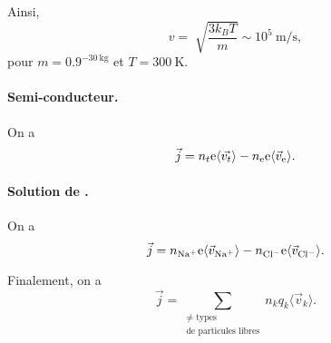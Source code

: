                 Ainsi,
                \begin{equation*}
                    v=\sqrt[]{\frac{3k_B T}{m}}\sim 10^{5}~\si{\metre\per\second},
                \end{equation*}
                pour $m=0.9^{-30~\si{\kilo\gram}}$ et $T=300~\si{\kelvin}$.

            \paragraph{Semi-conducteur.} 

                On a 
                \begin{equation*}
                    \vec{j}=n_t\mathrm{e}\langle \vec{v_t}\rangle-n_{\mathrm{e}}\mathrm{e}\langle\vec{v}_{\mathrm{e}}\rangle.
                \end{equation*}

            \paragraph{Solution de .}

                On a 
                \begin{equation*}
                    \vec{j}=n_{\ce{Na+}}\e\langle\vec{v}_{\ce{Na+}}\rangle-n_{\ce{Cl-}}\e\langle\vec{v}_{\ce{Cl-}}\rangle.
                \end{equation*}

            Finalement, on a 
            \begin{equation*}
                \boxed{
                    \vec{j}=\sum_{\substack{\neq\text{ types}\\\text{de particules libres}}}n_k q_k\langle \vec{v}_k\rangle.
                }
            \end{equation*}